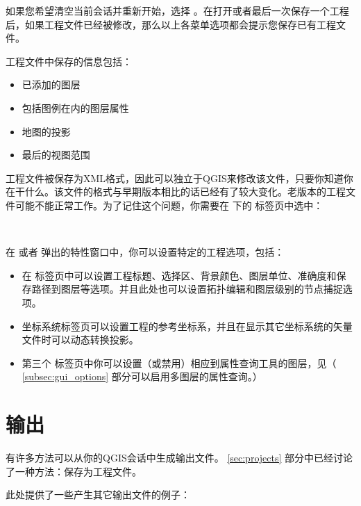 如果您希望清空当前会话并重新开始，选择  \arrow {} 。在打开或者最后一次保存一个工程后，如果工程文件已经被修改，那么以上各菜单选项都会提示您保存已有工程文件。

工程文件中保存的信息包括：

\begin{itemize}
\item 已添加的图层
\item 包括图例在内的图层属性
\item 地图的投影
\item 最后的视图范围
\end{itemize}

工程文件被保存为XML格式，因此可以独立于QGIS来修改该文件，只要你知道你在干什么。该文件的格式与早期版本相比的话已经有了较大变化。老版本的工程文件可能不能正常工作。为了记住这个问题，你需要在  \arrow {} 下的  标签页中选中：

 \\

在  或者  弹出的特性窗口中，你可以设置特定的工程选项，包括：

\begin{itemize}
\item 在  标签页中可以设置工程标题、选择区、背景颜色、图层单位、准确度和保存路径到图层等选项。并且此处也可以设置拓扑编辑和图层级别的节点捕捉选项。
\item {} 坐标系统标签页可以设置工程的参考坐标系，并且在显示其它坐标系统的矢量文件时可以动态转换投影。
\item 第三个  标签页中你可以设置（或禁用）相应到属性查询工具的图层，见（ \ref{subsec:gui_options} 部分可以启用多图层的属性查询。）
\end{itemize}

\section{输出}\label{sec:output}

有许多方法可以从你的QGIS会话中生成输出文件。 \ref{sec:projects} 部分中已经讨论了一种方法：保存为工程文件。

此处提供了一些产生其它输出文件的例子：

